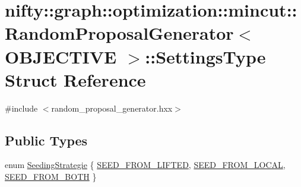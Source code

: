 \hypertarget{structnifty_1_1graph_1_1optimization_1_1mincut_1_1RandomProposalGenerator_1_1SettingsType}{}\section{nifty\+:\+:graph\+:\+:optimization\+:\+:mincut\+:\+:Random\+Proposal\+Generator$<$ O\+B\+J\+E\+C\+T\+I\+V\+E $>$\+:\+:Settings\+Type Struct Reference}
\label{structnifty_1_1graph_1_1optimization_1_1mincut_1_1RandomProposalGenerator_1_1SettingsType}


{\ttfamily \#include $<$random\+\_\+proposal\+\_\+generator.\+hxx$>$}

\subsection*{Public Types}
\begin{DoxyCompactItemize}
\item 
enum \hyperlink{structnifty_1_1graph_1_1optimization_1_1mincut_1_1RandomProposalGenerator_1_1SettingsType_a69d9ed79db5124704e966cf7cd6374ff}{Seeding\+Strategie} \{ \hyperlink{structnifty_1_1graph_1_1optimization_1_1mincut_1_1RandomProposalGenerator_1_1SettingsType_a69d9ed79db5124704e966cf7cd6374ffa352cb314c94b2e288ed361c1527470ad}{S\+E\+E\+D\+\_\+\+F\+R\+O\+M\+\_\+\+L\+I\+F\+T\+E\+D}, 
\hyperlink{structnifty_1_1graph_1_1optimization_1_1mincut_1_1RandomProposalGenerator_1_1SettingsType_a69d9ed79db5124704e966cf7cd6374ffa6d0b6f8abf35f99889c45a43c05724e7}{S\+E\+E\+D\+\_\+\+F\+R\+O\+M\+\_\+\+L\+O\+C\+A\+L}, 
\hyperlink{structnifty_1_1graph_1_1optimization_1_1mincut_1_1RandomProposalGenerator_1_1SettingsType_a69d9ed79db5124704e966cf7cd6374ffa200264feaad68b3254cd59d68bf6e66c}{S\+E\+E\+D\+\_\+\+F\+R\+O\+M\+\_\+\+B\+O\+T\+H}
 \}
\end{DoxyCompactItemize}
